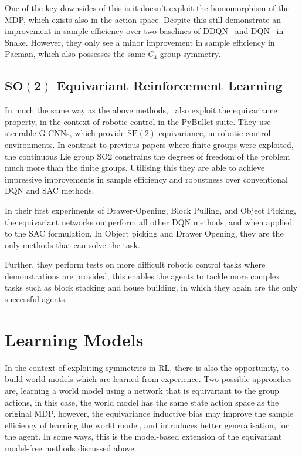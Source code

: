 One of the key downsides of this is it doesn't exploit the homomorphism of the MDP, which exists also in the action space. Despite this \cite{mondal2020group} still demonstrate an improvement in sample efficiency over two baselines of DDQN~\cite{van2016deep} and DQN~\cite{mnih2013playing} in Snake. However, they only see a minor improvement in sample efficiency in Pacman, which also possesses the same $C_4$ group symmetry.

\subsection{$\mathbf{\text{SO}(2)}$ Equivariant Reinforcement Learning}

In much the same way as the above methods,~\cite{wang2022so2} also exploit the equivariance property, in the context of robotic control in the PyBullet suite\cite{coumans2021}. They use steerable G-CNNs\cite{weiler2019general}, which provide $\text{SE}(2)$ equivariance, in robotic control environments. In contrast to previous papers where finite groups were exploited, the continuous Lie group $\text{SO}2$ constrains the degrees of freedom of the problem much more than the finite groups. Utilising this they are able to achieve impressive improvements in sample efficiency and robustness over conventional DQN and SAC methods.

In their first experiments of Drawer-Opening, Block Pulling, and Object Picking, the equivariant networks outperform all other DQN methods, and when applied to the SAC formulation, In Object picking and Drawer Opening, they are the only methods that can solve the task.

Further, they perform tests on more difficult robotic control tasks where demonstrations are provided, this enables the agents to tackle more complex tasks such as block stacking and house building, in which they again are the only successful agents.


\section{Learning Models}
In the context of exploiting symmetries in RL, there is also the opportunity, to build world models which are learned from experience. Two possible approaches are, learning a world model using a network that is equivariant to the group actions, in this case, the world model has the same state action space as the original MDP, however, the equivariance inductive bias may improve the sample efficiency of learning the world model, and introduces better generalisation, for the agent. In some ways, this is the model-based extension of the equivariant model-free methods discussed above.

